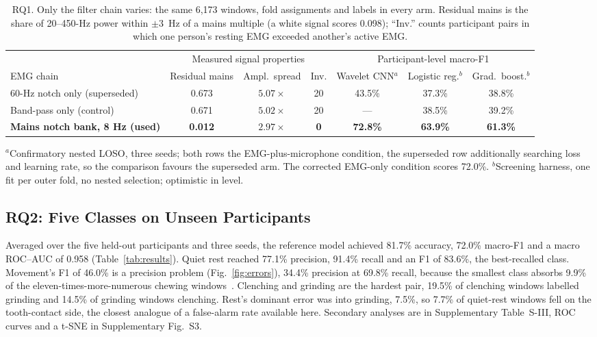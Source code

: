 \documentclass[journal]{IEEEtran}
\begin{document}
\begin{table}[!t]
  \centering
  \caption{RQ1. Only the filter chain varies: the same 6,173 windows, fold assignments and labels in every arm. Residual mains is the share of 20--450-Hz power within $\pm3$~Hz of a mains multiple (a white signal scores 0.098); ``Inv.'' counts participant pairs in which one person's resting EMG exceeded another's active EMG.}
  \label{tab:filter}
  \footnotesize
  \begin{tabular*}{\textwidth}{@{\extracolsep{\fill}}lcccccc@{}}
    \toprule
    & \multicolumn{3}{c}{Measured signal properties} & \multicolumn{3}{c}{Participant-level macro-F1} \\
    \cmidrule(lr){2-4}\cmidrule(lr){5-7}
    EMG chain & Residual mains & Ampl.\ spread & Inv. & Wavelet CNN$^{a}$ & Logistic reg.$^{b}$ & Grad.\ boost.$^{b}$ \\
    \midrule
    60-Hz notch only (superseded) & 0.673 & $5.07\times$ & 20 & 43.5\% & 37.3\% & 38.8\% \\
    Band-pass only (control) & 0.671 & $5.02\times$ & 20 & --- & 38.5\% & 39.2\% \\
    \textbf{Mains notch bank, 8 Hz (used)} & \textbf{0.012} & $\mathbf{2.97\times}$ & \textbf{0} & \textbf{72.8\%} & \textbf{63.9\%} & \textbf{61.3\%} \\
    \bottomrule
  \end{tabular*}
  \begin{flushleft}\footnotesize
  $^{a}$Confirmatory nested LOSO, three seeds; both rows the EMG-plus-microphone condition, the superseded row additionally searching loss and learning rate, so the comparison favours the superseded arm. The corrected EMG-only condition scores 72.0\%.
  $^{b}$Screening harness, one fit per outer fold, no nested selection; optimistic in level.
  \end{flushleft}
\end{table}

\subsection{RQ2: Five Classes on Unseen Participants}
\label{sec:rq2}

Averaged over the five held-out participants and three seeds, the reference model achieved 81.7\% accuracy, 72.0\% macro-F1 and a macro ROC--AUC of 0.958 (Table~\ref{tab:results}). Quiet rest reached 77.1\% precision, 91.4\% recall and an F1 of 83.6\%, the best-recalled class. Movement's F1 of 46.0\% is a precision problem (Fig.~\ref{fig:errors}), 34.4\% precision at 69.8\% recall, because the smallest class absorbs 9.9\% of the eleven-times-more-numerous chewing windows~\cite{saito2015precision}. Clenching and grinding are the hardest pair, 19.5\% of clenching windows labelled grinding and 14.5\% of grinding windows clenching. Rest's dominant error was into grinding, 7.5\%, so 7.7\% of quiet-rest windows fell on the tooth-contact side, the closest analogue of a false-alarm rate available here. Secondary analyses are in Supplementary Table~S-III, ROC curves and a t-SNE in Supplementary Fig.~S3.
\end{document}

